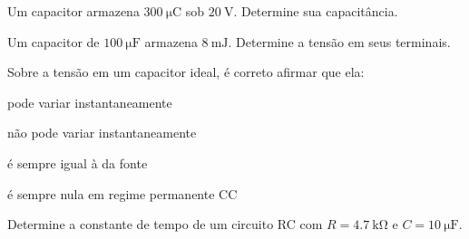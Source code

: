 \blocofixacao
\begin{questao}[1]{}

Um capacitor armazena $\SI{300}{\micro\coulomb}$ sob $\SI{20}{\volt}$.
Determine sua capacitância.


\end{questao}
\begin{questao}[1]{}

Um capacitor de $\SI{100}{\micro\farad}$ armazena $\SI{8}{\milli\joule}$.
Determine a tensão em seus terminais.


\end{questao}
\begin{questao}[1]{}

Sobre a tensão em um capacitor ideal, é correto afirmar que ela:
\begin{alternativas}[2]
\item pode variar instantaneamente
\item não pode variar instantaneamente
\item é sempre igual à da fonte
\item é sempre nula em regime permanente CC
\end{alternativas}


\end{questao}
\begin{questao}[1]{}

Determine a constante de tempo de um circuito RC com
$R=\SI{4.7}{\kilo\ohm}$ e $C=\SI{10}{\micro\farad}$.


\end{questao}

